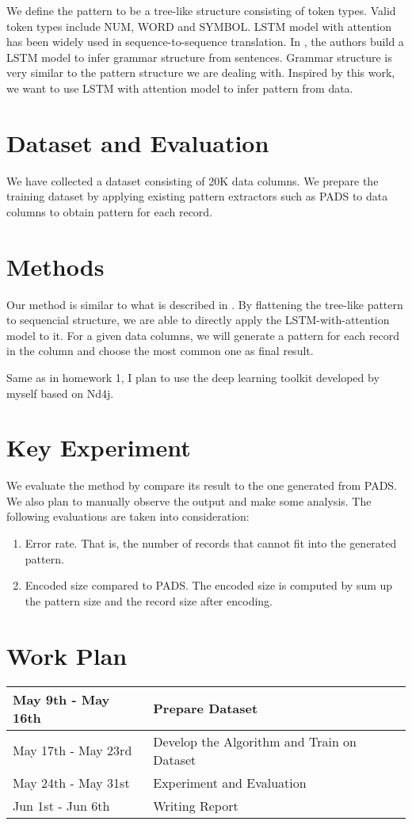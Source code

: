 \documentclass{article}
\begin{document}
We define the pattern to be a tree-like structure consisting of token types. Valid
token types include NUM, WORD and SYMBOL. LSTM model with attention has been widely
used in sequence-to-sequence translation. In \cite{grammar_2014}, the authors build
a LSTM model to infer grammar structure from sentences. Grammar structure is very similar
to the pattern structure we are dealing with. Inspired by this work, we want to use
LSTM with attention model to infer pattern from data.

\section{Dataset and Evaluation}
We have collected a dataset consisting of 20K data columns. We prepare
the training dataset by applying existing pattern extractors such as
PADS\cite{pads_2008} to data columns to obtain pattern for each record.

\section{Methods}

Our method is similar to what is described in \cite{grammar_2014}. By flattening
the tree-like pattern to sequencial structure, we are able to directly apply the
LSTM-with-attention model to it. For a given data columns, we will generate a
pattern for each record in the column and choose the most common one as final result.

Same as in homework 1, I plan to use the deep learning toolkit developed by
myself based on Nd4j. 
\section{Key Experiment}
We evaluate the method by compare its result to the one generated from PADS.
We also plan to manually observe the output and make some analysis. The
following evaluations are taken into consideration:
\begin{enumerate}
  \item Error rate. That is, the number of records that cannot fit into the
  generated pattern.
  \item Encoded size compared to PADS. The encoded size is computed by sum up
  the pattern size and the record size after encoding.
\end{enumerate}

\section{Work Plan}
\begin{tabular}{l|l}
May 9th - May 16th & Prepare Dataset\\
\hline
May 17th - May 23rd & Develop the Algorithm and Train on Dataset\\
\hline
May 24th - May 31st & Experiment and Evaluation \\
\hline
Jun 1st - Jun 6th & Writing Report
\end{tabular}



\end{document}
